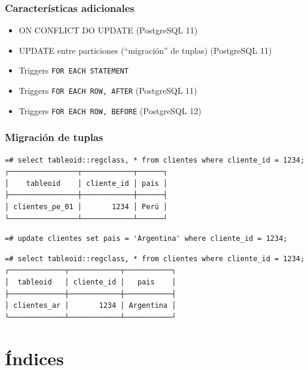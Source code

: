 \documentclass[ignorenonframetext,t]{beamer}
\begin{document}
\begin{frame}
	\frametitle{Características adicionales}
	\begin{itemize}
		\item ON CONFLICT DO UPDATE (PostgreSQL 11)
		\item UPDATE entre particiones (``migración'' de tuplas) (PostgreSQL 11)
		\item Triggers \texttt{FOR EACH STATEMENT}
		\item Triggers \texttt{FOR EACH ROW, AFTER} (PostgreSQL 11)
		\item Triggers \texttt{FOR EACH ROW, BEFORE} (PostgreSQL 12)
	\end{itemize}
\end{frame}

\begin{frame}[fragile]
	\frametitle{Migración de tuplas}
	\footnotesize
\begin{verbatim}
=# select tableoid::regclass, * from clientes where cliente_id = 1234;
┌────────────────┬────────────┬──────┐
│    tableoid    │ cliente_id │ pais │
├────────────────┼────────────┼──────┤
│ clientes_pe_01 │       1234 │ Perú │
└────────────────┴────────────┴──────┘
\end{verbatim}
	\begin{lstlisting}
=# update clientes set pais = 'Argentina' where cliente_id = 1234;
	\end{lstlisting}
\pause

	\begin{verbatim}
=# select tableoid::regclass, * from clientes where cliente_id = 1234;
┌─────────────┬────────────┬───────────┐
│  tableoid   │ cliente_id │   pais    │
├─────────────┼────────────┼───────────┤
│ clientes_ar │       1234 │ Argentina │
└─────────────┴────────────┴───────────┘
\end{verbatim}	
\end{frame}
\section{Índices}
\end{document}
